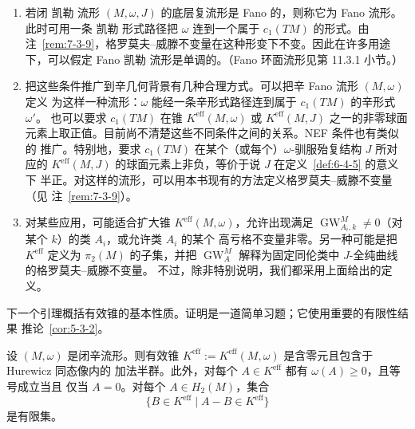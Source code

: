 \begin{remark}
\begin{enumerate}[label=\textnormal{(\roman*)}]
\item 若闭 凯勒 流形 $(M,\omega,J)$ 的底层复流形是 Fano 的，则称它为 Fano 流形。
此时可用一条 凯勒 形式路径把 $\omega$ 连到一个属于 $c_1(TM)$ 的形式。由
注~\ref{rem:7-3-9}，格罗莫夫--威滕不变量在这种形变下不变。因此在许多用途下，可以假定
Fano 凯勒 流形是单调的。（Fano 环面流形见第 11.3.1 小节。）

\item 把这些条件推广到辛几何背景有几种合理方式。可以把辛 Fano 流形 $(M,\omega)$ 定义
为这样一种流形：$\omega$ 能经一条辛形式路径连到属于 $c_1(TM)$ 的辛形式 $\omega'$。
也可以要求 $c_1(TM)$ 在锥 $K^{\mathrm{eff}}(M,\omega)$ 或 $K^{\mathrm{eff}}(M,J)$
之一的非零球面元素上取正值。目前尚不清楚这些不同条件之间的关系。NEF 条件也有类似的
推广。特别地，要求 $c_1(TM)$ 在某个（或每个）$\omega$-驯服殆复结构 $J$ 所对应的
$K^{\mathrm{eff}}(M,J)$ 的球面元素上非负，等价于说 $J$ 在定义~\ref{def:6-4-5} 的意义下
半正。对这样的流形，可以用本书现有的方法定义格罗莫夫--威滕不变量（见
注~\ref{rem:7-3-9}）。

\item 对某些应用，可能适合扩大锥 $K^{\mathrm{eff}}(M,\omega)$，允许出现满足
$\operatorname{GW}_{A_i,k}^M\ne0$（对某个 $k$）的类 $A_i$，或允许类 $A_i$ 的某个
高亏格不变量非零。另一种可能是把 $K^{\mathrm{eff}}$ 定义为 $\pi_2(M)$ 的子集，并把
$\operatorname{GW}_A^M$ 解释为固定同伦类中 $J$-全纯曲线的格罗莫夫--威滕不变量。
不过，除非特别说明，我们都采用上面给出的定义。
\end{enumerate}
\end{remark}

下一个引理概括有效锥的基本性质。证明是一道简单习题；它使用重要的有限性结果
推论~\ref{cor:5-3-2}。

\begin{lemma}\label{lem:11-1-2}
设 $(M,\omega)$ 是闭辛流形。则有效锥
$K^{\mathrm{eff}}:=K^{\mathrm{eff}}(M,\omega)$ 是含零元且包含于 Hurewicz 同态像内的
加法半群。此外，对每个 $A\in K^{\mathrm{eff}}$ 都有 $\omega(A)\ge0$，且等号成立当且
仅当 $A=0$。对每个 $A\in H_2(M)$，集合
\[
  \{B\in K^{\mathrm{eff}}\mid A-B\in K^{\mathrm{eff}}\}
\]
是有限集。
\end{lemma}

